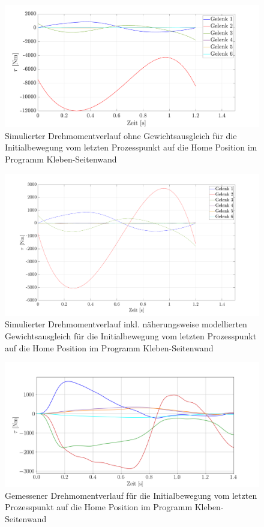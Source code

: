 \begin{figure}[tbph]
	\centering
	\includegraphics[width=1\linewidth]{images/taumat}
	\caption{Simulierter Drehmomentverlauf ohne Gewichtsausgleich für die Initialbewegung vom letzten Prozesspunkt auf die  Home Position im Programm Kleben-Seitenwand}
	\label{fig:taumat}
\end{figure}
%
\begin{figure}[tbph]
	\centering
	\includegraphics[width=1\linewidth]{images/taumat-fg}
	\caption{Simulierter Drehmomentverlauf inkl. näherungsweise modellierten Gewichtsausgleich für die Initialbewegung vom letzten Prozesspunkt auf die  Home Position im Programm Kleben-Seitenwand}
	\label{fig:taumat-fg}
\end{figure}
%
\begin{figure}[tbph]
	\centering
	\includegraphics[width=1\linewidth]{images/tau}
	\caption{Gemessener Drehmomentverlauf für die Initialbewegung vom letzten Prozesspunkt auf die  Home Position im Programm Kleben-Seitenwand}
	\label{fig:tau}
\end{figure}

